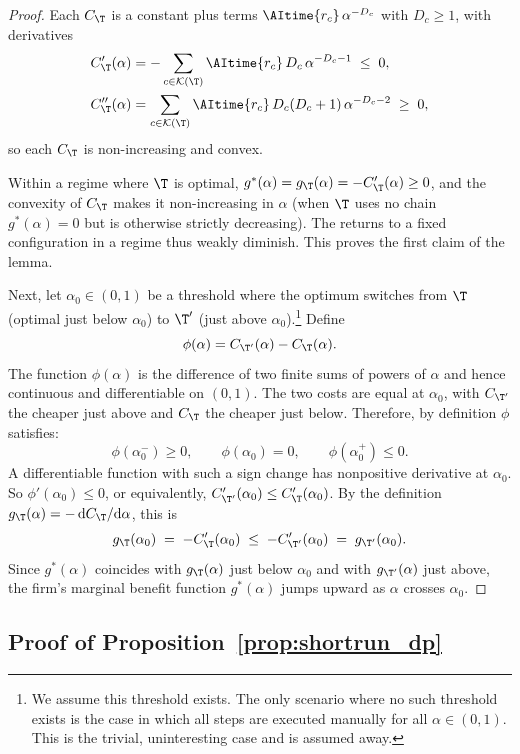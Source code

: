 \begin{proof}
Each $C_\T$ is a constant plus terms $\AItime{r_c}\,\alpha^{-D_c}$ with $D_c \ge 1$, with derivatives
\[
\begin{aligned}
C_\T'(\alpha) &= -\sum_{c \in \mathcal{K}(\T)} \AItime{r_c}\,D_c\,\alpha^{-D_c-1} \;\le\; 0, \\
C_\T''(\alpha) &= \sum_{c \in \mathcal{K}(\T)} \AItime{r_c}\,D_c(D_c+1)\,\alpha^{-D_c-2} \;\ge\; 0,
\end{aligned}
\]
so each $C_\T$ is non-increasing and convex.

Within a regime where $\T$ is optimal, $g^*(\alpha) = g_\T(\alpha) = -C_\T'(\alpha) \ge 0$, and the convexity of $C_\T$ makes it non-increasing in $\alpha$ (when $\T$ uses no chain $g^*(\alpha) = 0$ but is otherwise strictly decreasing).
The returns to a fixed configuration in a regime thus weakly diminish.
This proves the first claim of the lemma.

Next, let $\alpha_0 \in (0,1)$ be a threshold where the optimum switches from $\T$ (optimal just below $\alpha_0$) to $\T'$ (just above $\alpha_0$).\footnote{We assume this threshold exists. The only scenario where no such threshold exists is the case in which all steps are executed manually for all $\alpha \in (0,1)$. This is the trivial, uninteresting case and is assumed away.}
Define
\[
\phi(\alpha) = C_{\T'}(\alpha) - C_\T(\alpha).
\]
The function $\phi(\alpha)$ is the difference of two finite sums of powers of $\alpha$ and hence continuous and differentiable on $(0,1)$. 
The two costs are equal at $\alpha_0$, with $C_{\T'}$ the cheaper just above and $C_\T$ the cheaper just below.
Therefore, by definition $\phi$ satisfies:
\[
\phi(\alpha_0^{-}) \ge 0,
\qquad
\phi(\alpha_0) = 0,
\qquad
\phi(\alpha_0^{+}) \le 0.
\]
A differentiable function with such a sign change has nonpositive derivative at $\alpha_0$.
So $\phi'(\alpha_0) \le 0$, or equivalently, $C_{\T'}'(\alpha_0) \le C_\T'(\alpha_0)$.
By the definition $g_\T(\alpha) = -\,\mathrm{d}C_\T/\mathrm{d}\alpha$, this is
\[
g_\T(\alpha_0) \;=\; -C_\T'(\alpha_0)
\;\le\;
-C_{\T'}'(\alpha_0) \;=\; g_{\T'}(\alpha_0).
\]
Since $g^*(\alpha)$ coincides with $g_\T(\alpha)$ just below $\alpha_0$ and with $g_{\T'}(\alpha)$ just above, the firm's marginal benefit function $g^*(\alpha)$ jumps upward as $\alpha$ crosses $\alpha_0$.
\end{proof}

\subsection{Proof of Proposition~\ref{prop:shortrun_dp}}
\label{app:shortrun_proof}

